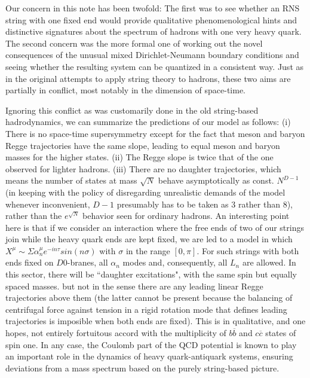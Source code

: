 \documentclass[a4paper,a4paper]{article}
\begin{document}
Our concern in this note has been twofold: The first was to see whether an
RNS string with one fixed end would provide qualitative
phenomenological hints and distinctive signatures about the spectrum of
hadrons with one very heavy quark.  The second concern was the more formal
one of working out the novel consequences of the unusual mixed
Dirichlet-Neumann boundary conditions and seeing  whether the
resulting system can be quantized in a consistent way. Just as in the
original attempts to apply string theory to hadrons, these two aims are
partially in conflict, most notably in the dimension of space-time.

Ignoring this conflict as was customarily done in the old string-based
hadrodynamics, we can summarize the predictions of our model as follows:
(i) There is no
space-time supersymmetry except for the fact that meson and baryon Regge
trajectories have the same slope, leading to equal meson and baryon masses
for the higher states. (ii)  The Regge slope is twice that of the one
observed for lighter hadrons. (iii) There are no daughter trajectories,
which means the number of states at mass $\sqrt N$ behave asymptotically
as const. $N^{D-1}$ (in keeping with the policy of disregarding
unrealistic demands of the model whenever inconvenient, $D-1$ presumably
has to be taken as 3 rather than 8), rather than the $e^{\sqrt N}$
behavior seen for ordinary hadrons.  An interesting point here is that if
we consider an interaction where the free
ends of two of our strings  join  while the heavy quark ends are kept
fixed, we are led to a model in which $X^{\mu}\sim \Sigma
\alpha_{n}^{\mu}e^{-in{\tau}}sin(n\sigma)$ with $\sigma$ in the range
$[0,\pi]$.  For such strings with both ends fixed on $D0$-branes, all
$\alpha_n$ modes and, consequently, all $L_n$ are allowed.  In this
sector, there will be ``daughter excitations", with the same spin but
equally spaced masses. but not in the sense there
are any leading linear Regge trajectories above them (the latter cannot be
present  because the
balancing of centrifugal force against tension in a rigid rotation
mode that defines leading trajectories is imposible when both
ends are fixed). This is in qualitative, and one hopes, not entirely
fortuitous  accord with the multiplicity of
$b\overline{b}$ and $c\overline{c}$ states of spin one. In any case,
the Coulomb part of the QCD potential is known to play an
important role in the dynamics of heavy quark-antiquark systems, ensuring
deviations from a mass spectrum based on the purely string-based picture.
\end{document}
